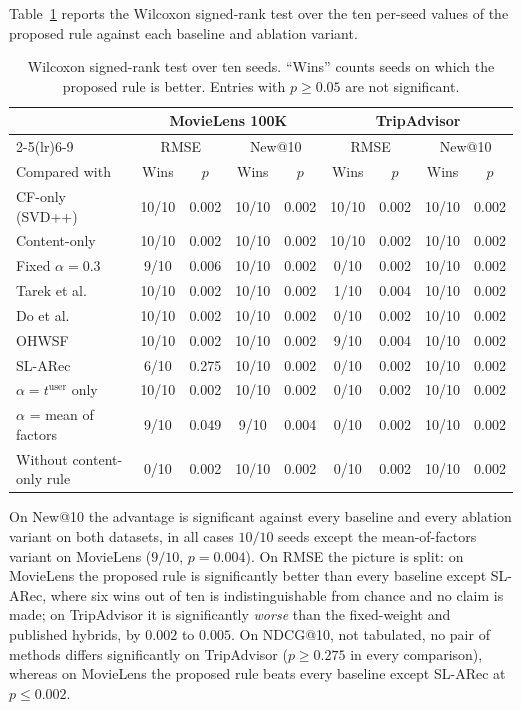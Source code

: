 \documentclass[runningheads]{llncs}
\begin{document}
Table~\ref{tab:wilcoxon} reports the Wilcoxon signed-rank test over the ten per-seed values of the proposed rule against each baseline and ablation variant.

\begin{table}[t]
  \caption{Wilcoxon signed-rank test over ten seeds. ``Wins'' counts seeds on which the proposed rule is better. Entries with $p \ge 0.05$ are not significant.}
  \label{tab:wilcoxon}
  \centering
  \small
  \setlength{\tabcolsep}{3.5pt}
  \begin{tabular}{l cc cc cc cc}
    \toprule
    & \multicolumn{4}{c}{MovieLens 100K} & \multicolumn{4}{c}{TripAdvisor} \\
    \cmidrule(lr){2-5}\cmidrule(lr){6-9}
    & \multicolumn{2}{c}{RMSE} & \multicolumn{2}{c}{New@10} & \multicolumn{2}{c}{RMSE} & \multicolumn{2}{c}{New@10} \\
    Compared with & Wins & $p$ & Wins & $p$ & Wins & $p$ & Wins & $p$ \\
    \midrule
    CF-only (SVD++)      & 10/10 & 0.002 & 10/10 & 0.002 & 10/10 & 0.002 & 10/10 & 0.002 \\
    Content-only         & 10/10 & 0.002 & 10/10 & 0.002 & 10/10 & 0.002 & 10/10 & 0.002 \\
    Fixed $\alpha=0.3$   &  9/10 & 0.006 & 10/10 & 0.002 &  0/10 & 0.002 & 10/10 & 0.002 \\
    Tarek et al.         & 10/10 & 0.002 & 10/10 & 0.002 &  1/10 & 0.004 & 10/10 & 0.002 \\
    Do et al.            & 10/10 & 0.002 & 10/10 & 0.002 &  0/10 & 0.002 & 10/10 & 0.002 \\
    OHWSF                & 10/10 & 0.002 & 10/10 & 0.002 &  9/10 & 0.004 & 10/10 & 0.002 \\
    SL-ARec              &  6/10 & 0.275 & 10/10 & 0.002 &  0/10 & 0.002 & 10/10 & 0.002 \\
    \midrule
    $\alpha = t^{\mathrm{user}}$ only          & 10/10 & 0.002 & 10/10 & 0.002 & 0/10 & 0.002 & 10/10 & 0.002 \\
    $\alpha$ = mean of factors                 &  9/10 & 0.049 &  9/10 & 0.004 & 0/10 & 0.002 & 10/10 & 0.002 \\
    Without content-only rule                  &  0/10 & 0.002 & 10/10 & 0.002 & 0/10 & 0.002 & 10/10 & 0.002 \\
    \bottomrule
  \end{tabular}
\end{table}

On New@10 the advantage is significant against every baseline and every ablation variant on both datasets, in all cases $10/10$ seeds except the mean-of-factors variant on MovieLens ($9/10$, $p = 0.004$). On RMSE the picture is split: on MovieLens the proposed rule is significantly better than every baseline except SL-ARec, where six wins out of ten is indistinguishable from chance and no claim is made; on TripAdvisor it is significantly \emph{worse} than the fixed-weight and published hybrids, by $0.002$ to $0.005$. On NDCG@10, not tabulated, no pair of methods differs significantly on TripAdvisor ($p \ge 0.275$ in every comparison), whereas on MovieLens the proposed rule beats every baseline except SL-ARec at $p \le 0.002$.
\end{document}
